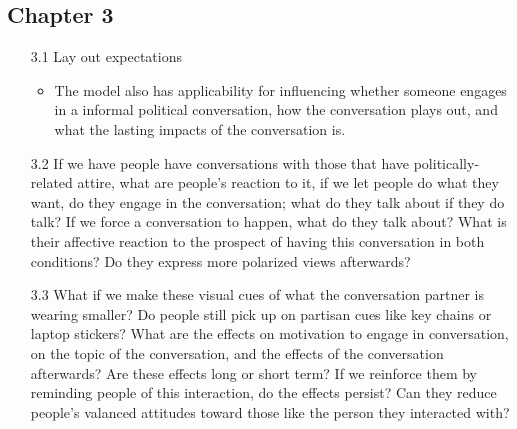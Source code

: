 \documentclass [12pt]{article}
\begin{document}
    \subsection*{Chapter 3}
        \begin{itemize}
            \item[3.1] Lay out expectations
            \begin{itemize}
                \item The model also has applicability for influencing whether someone engages in a informal political conversation, how the conversation plays out, and what the lasting impacts of the conversation is.
            \end{itemize}
            \item[3.2] If we have people have conversations with those that have politically-related attire, what are people's reaction to it, if we let people do what they want, do they engage in the conversation; what do they talk about if they do talk? If we force a conversation to happen, what do they talk about? What is their affective reaction to the prospect of having this conversation in both conditions? Do they express more polarized views afterwards?
            \item[3.3] What if we make these visual cues of what the conversation partner is wearing smaller? Do people still pick up on partisan cues like key chains or laptop stickers? What are the effects on motivation to engage in conversation, on the topic of the conversation, and the effects of the conversation afterwards? Are these effects long or short term? If we reinforce them by reminding people of this interaction, do the effects persist? Can they reduce people's valanced attitudes toward those like the person they interacted with?
        \end{itemize}
%
\end{document}
